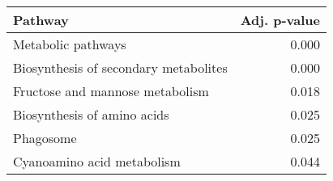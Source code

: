 \begin{tabular}{lr}
\toprule
                               Pathway &  Adj. p-value \\
\midrule
                    Metabolic pathways &         0.000 \\
 Biosynthesis of secondary metabolites &         0.000 \\
       Fructose and mannose metabolism &         0.018 \\
           Biosynthesis of amino acids &         0.025 \\
                             Phagosome &         0.025 \\
            Cyanoamino acid metabolism &         0.044 \\
\bottomrule
\end{tabular}
